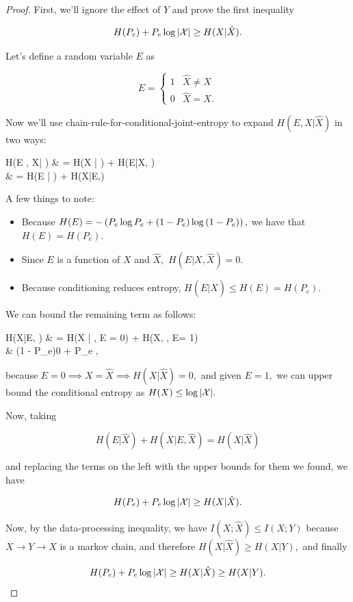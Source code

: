 \documentclass{article}
\begin{document}
\begin{proof}
First, we'll ignore the effect of $Y$ and prove the first inequality

	\[ H(P_e) + P_e \log{\left| \mathcal{X} \right|} \geq H(X|\hat{X}). \]

	Let's define a \@{random variable} $E$ as

        \[ E = \begin{cases}
		1 & \hat{X} \neq X \\
		0 & \hat{X} = X.
	\end{cases} \]

	Now we'll use \@{chain-rule-for-conditional-joint-entropy} to expand $H(E, X | \hat{X})$ in two ways:

	\bal
	H(E , X| ) & = H(X | ) + H(E|X, ) \\
	                  & = H(E | ) + H(X|E,) \\
	\eal

	A few things to note:
	\begin{itemize}
		\item Because $H(E) = - \left(P_e \log{P_e} + (1 - P_e)\log{(1 - P_e)}\right),$ we have that $H(E) = H(P_e).$
		\item Since $E$ is a function of $X$ and $\hat{X},$ $H(E|X, \hat{X}) = 0.$
		\item Because \@{conditioning reduces entropy}, $H(E | \hat{X}) \leq H(E) = H(P_e).$
	\end{itemize}

	We can bound the remaining term as follows:

	\bal
	H(X|E, ) & = H(X | , E = 0) + H(X, , E= 1) \\
                        & \leq (1 - P_e)0 + P_e ,
	\eal

	because $E = 0 \implies X = \hat{X} \implies H(X|\hat{X}) = 0,$ and given $E = 1,$ we can upper bound
	the conditional entropy as $H(X) \leq \log{\left| \mathcal{X} \right|}.$

	Now, taking

	\[ H(E|\hat{X}) + H(X|E, \hat{X}) = H(X|\hat{X}) \]

	and replacing the terms on the left with the upper bounds for them we found, we have

	\[ H(P_e) + P_e \log{\left| \mathcal{X} \right|} \geq H(X|\hat{X}). \]

	Now, by the \@{data-processing inequality}, we have $I(X; \hat{X}) \leq I(X; Y)$ because
	$X \to Y \to \hat{X}$ is a \@{markov chain}, and therefore $H(X|\hat{X}) \geq H(X|Y),$ and finally

	\[ H(P_e) + P_e \log{\left| \mathcal{X} \right|} \geq H(X|\hat{X}) \geq H(X|Y). \]
\end{proof}
\end{document}
